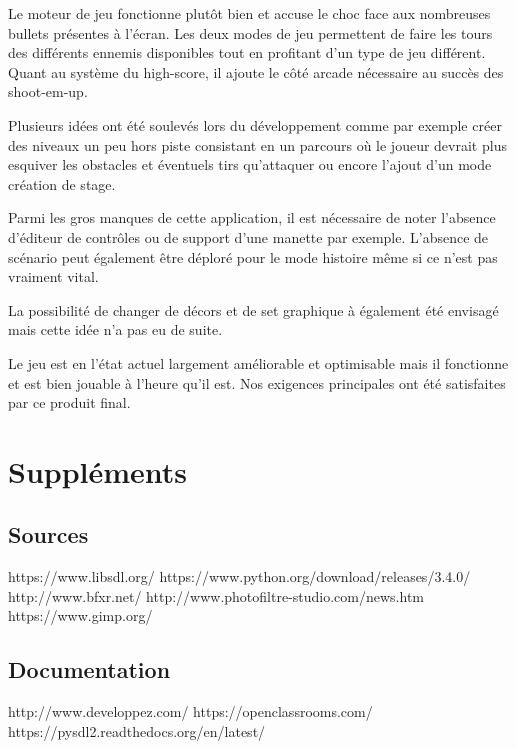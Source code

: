 \documentclass{article}
\begin{document}
Le moteur de jeu fonctionne plutôt bien et accuse le choc face aux nombreuses bullets présentes à l'écran. Les deux modes de jeu permettent de faire les tours des différents ennemis disponibles tout en profitant d'un type de jeu différent. Quant au système du high-score, il ajoute le côté arcade nécessaire au succès des shoot-em-up. \newline

Plusieurs idées ont été soulevés lors du développement comme par exemple créer des niveaux un peu hors piste consistant en un parcours où le joueur devrait plus esquiver les obstacles et éventuels tirs qu'attaquer ou encore l'ajout d'un mode création de stage. \newline

Parmi les gros manques de cette application, il est nécessaire de noter l'absence d'éditeur de contrôles ou de support d'une manette par exemple. L'absence de scénario peut également être déploré pour le mode histoire même si ce n'est pas vraiment vital.

La possibilité de changer de décors et de set graphique à également été envisagé mais cette idée n'a pas eu de suite. \newline

Le jeu est en l'état actuel largement améliorable et optimisable mais il fonctionne et est bien jouable à l'heure qu'il est. Nos exigences principales ont été satisfaites par ce produit final.

\newpage

\section{Suppléments}

\subsection{Sources}

\noindent https://www.libsdl.org/ \newline
https://www.python.org/download/releases/3.4.0/ \newline
http://www.bfxr.net/ \newline
http://www.photofiltre-studio.com/news.htm \newline
https://www.gimp.org/


\subsection{Documentation}

\noindent http://www.developpez.com/ \newline
https://openclassrooms.com/ \newline
https://pysdl2.readthedocs.org/en/latest/
\end{document}
